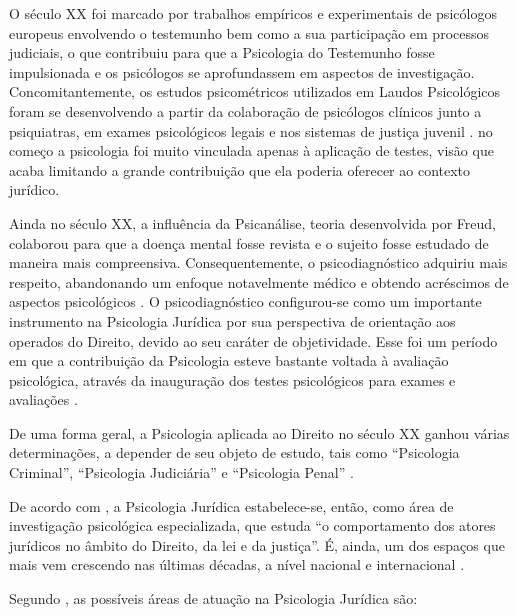 O século XX foi marcado por trabalhos empíricos e experimentais de psicólogos europeus envolvendo o testemunho bem como a sua participação em processos judiciais, o que contribuiu para que a Psicologia do Testemunho fosse impulsionada e os psicólogos se aprofundassem em aspectos de investigação. Concomitantemente, os estudos psicométricos utilizados em Laudos Psicológicos foram se desenvolvendo a partir da colaboração de psicólogos clínicos junto a psiquiatras, em exames psicológicos legais e nos sistemas de justiça juvenil \cite{JESUS2001}. no começo a psicologia foi muito vinculada apenas à aplicação de testes, visão que acaba limitando a grande contribuição que ela poderia oferecer ao contexto jurídico.

Ainda no século XX, a influência da Psicanálise, teoria desenvolvida por Freud, colaborou para que a doença mental fosse revista e o sujeito fosse estudado de maneira mais compreensiva. Consequentemente, o psicodiagnóstico adquiriu mais respeito, abandonando um enfoque notavelmente médico e obtendo acréscimos de aspectos psicológicos . O psicodiagnóstico configurou-se como um importante instrumento na Psicologia Jurídica por sua perspectiva de orientação aos operados do Direito, devido ao seu caráter de objetividade. Esse foi um período em que a contribuição da Psicologia esteve bastante voltada à avaliação psicológica, através da inauguração dos testes psicológicos para exames e avaliações \cite{LAGO2009}.

De uma forma geral, a Psicologia aplicada ao Direito no século XX ganhou várias determinações, a depender de seu objeto de estudo, tais como ``Psicologia Criminal'', ``Psicologia Judiciária'' e ``Psicologia Penal'' \cite[p. 234]{COSTA2009}.

De acordo com , a Psicologia Jurídica estabelece-se, então, como área de investigação psicológica especializada, que estuda ``o comportamento dos atores jurídicos no âmbito do Direito, da lei e da justiça''. É, ainda, um dos espaços que mais vem crescendo nas últimas décadas, a nível nacional e internacional \cite{LEAL2008}.

Segundo , as possíveis áreas de atuação na Psicologia Jurídica são:

